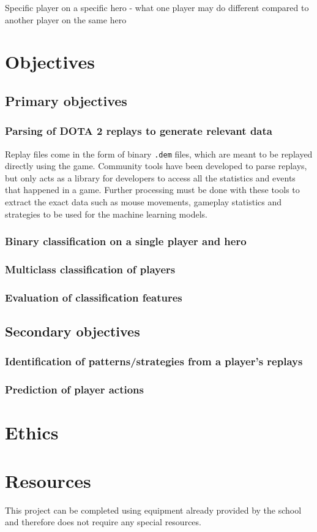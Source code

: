 \documentclass{sty/SizheArticle}
\begin{document}
Specific player on a specific hero
- what one player may do different compared to another player on the same hero

\section{Objectives}
\subsection{Primary objectives}

\subsubsection{Parsing of DOTA 2 replays to generate relevant data}
Replay files come in the form of binary \texttt{.dem} files, which are meant to be replayed directly using the game. Community tools have been developed to parse replays, but only acts as a library for developers to access all the statistics and events that happened in a game. Further processing must be done with these tools to extract the exact data such as mouse movements, gameplay statistics and strategies to be used for the machine learning models. 

\subsubsection{Binary classification on a single player and hero}


\subsubsection{Multiclass classification of players}


\subsubsection{Evaluation of classification features}


\subsection{Secondary objectives}

\subsubsection{Identification of patterns/strategies from a player's replays}

\subsubsection{Prediction of player actions}




\section{Ethics}


\section{Resources}
This project can be completed using equipment already provided by the school and therefore does not require any special resources.
\end{document}
